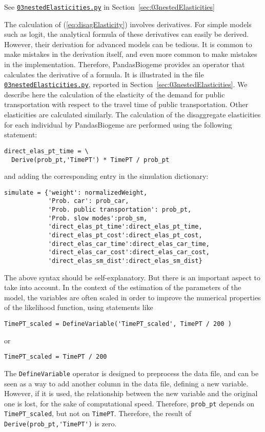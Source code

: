 \documentclass[12pt,a4paper]{article}
\newcommand{\req}[1]{(\ref{#1})}
\begin{document}
\begin{flushright}
See \href{http://biogeme.epfl.ch/examples/indicators/python/03nestedElasticities.py}{\lstinline$03nestedElasticities.py$} in Section~\ref{sec:03nestedElasticities}
\end{flushright}

The calculation of \req{eq:disagElasticity} involves derivatives. For
simple models such as logit, the analytical formula of these
derivatives can easily be derived. However, their derivation for
advanced models can be tedious. It is common to make mistakes in the
derivation itself, and even more common to make mistakes in the
implementation. Therefore, PandasBiogeme provides an operator that
calculates the derivative of a formula. It is illustrated in the
file \href{http://biogeme.epfl.ch/examples/indicators/python/03nestedElasticities.py}{\lstinline$03nestedElasticities.py$}, reported in
Section~\ref{sec:03nestedElasticities}. We describe here the
calculation of the elasticity of the demand for public transportation
with respect to the travel time of public transportation. Other
elasticities are calculated similarly.  The calculation of the 
 disaggregate elasticities for each individual by PandasBiogeme are
 performed using the following statement:
\begin{lstlisting}
direct_elas_pt_time = \
  Derive(prob_pt,'TimePT') * TimePT / prob_pt 
\end{lstlisting}
and adding the corresponding entry in the simulation dictionary:
\begin{lstlisting}
simulate = {'weight': normalizedWeight,
            'Prob. car': prob_car,
            'Prob. public transportation': prob_pt,
            'Prob. slow modes':prob_sm,
            'direct_elas_pt_time':direct_elas_pt_time,
            'direct_elas_pt_cost':direct_elas_pt_cost,
            'direct_elas_car_time':direct_elas_car_time,
            'direct_elas_car_cost':direct_elas_car_cost,
            'direct_elas_sm_dist':direct_elas_sm_dist}
\end{lstlisting}

The above syntax should be self-explanatory. But there is an important
aspect to take into account. In the context of the estimation of the
parameters of the model, the variables are often scaled in order to
improve the numerical properties of the likelihood function, using
statements like
\begin{lstlisting}
TimePT_scaled = DefineVariable('TimePT_scaled', TimePT / 200 )
\end{lstlisting}
or 
\begin{lstlisting}
TimePT_scaled = TimePT / 200
\end{lstlisting}
The \lstinline$DefineVariable$ operator is designed to preprocess the
data file, and can be seen as a way to add another column in the data
file, defining a new variable. However, if it is used, the
relationship between the new variable and the original one is lost,
for the sake of computational speed.
Therefore, \lstinline+prob_pt+ depends on \lstinline+TimePT_scaled+,
but  not  on \lstinline+TimePT+. Therefore, the result of 
\lstinline+Derive(prob_pt,'TimePT')+ is zero.
\end{document}
